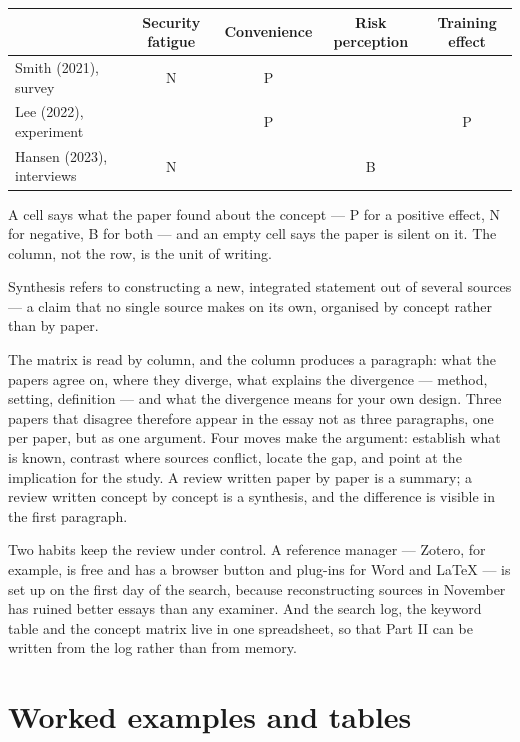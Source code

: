 \documentclass[11pt,a4paper,british,twoside=false,headings=small,chapterprefix=false,numbers=noenddot]{scrbook}
\newenvironment{block}[1]{\begin{tcolorbox}[scriptbox, title={#1}]}{\end{tcolorbox}}
\begin{document}
\begin{center}\small
  \renewcommand{\arraystretch}{1.2}
  \begin{tabular}{@{}p{3.6cm}cccc@{}}
    \toprule
     & \textbf{Security fatigue} & \textbf{Convenience} & \textbf{Risk perception} & \textbf{Training effect}\\
    \midrule
    Smith (2021), survey        & N & P &   & \\
    Lee (2022), experiment      &   & P &   & P\\
    Hansen (2023), interviews   & N &   & B & \\
    \bottomrule
  \end{tabular}
\end{center}

A cell says what the paper found about the concept --- P for a positive effect, N for negative, B for both --- and an empty cell says the paper is silent on it. The column, not the row, is the unit of writing.

\begin{block}{Synthesis}
Synthesis refers to constructing a new, integrated statement out of several sources --- a claim that no single source makes on its own, organised by concept rather than by paper.
\end{block}

The matrix is read by column, and the column produces a paragraph: what the papers agree on, where they diverge, what explains the divergence --- method, setting, definition --- and what the divergence means for your own design. Three papers that disagree therefore appear in the essay not as three paragraphs, one per paper, but as one argument. Four moves make the argument: establish what is known, contrast where sources conflict, locate the gap, and point at the implication for the study. A review written paper by paper is a summary; a review written concept by concept is a synthesis, and the difference is visible in the first paragraph.

Two habits keep the review under control. A reference manager --- Zotero, for example, is free and has a browser button and plug-ins for Word and LaTeX --- is set up on the first day of the search, because reconstructing sources in November has ruined better essays than any examiner. And the search log, the keyword table and the concept matrix live in one spreadsheet, so that Part II can be written from the log rather than from memory.


\section{Worked examples and tables}
\end{document}
